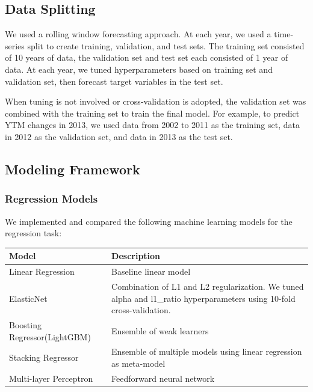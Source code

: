 \documentclass[12pt]{article}
\begin{document}
\subsection{Data Splitting}

We used a rolling window forecasting approach. At each year, we used a time-series split to create training, validation, and test sets. The training set consisted of 10 years of data, the validation set and test set each consisted of 1 year of data. At each year, we tuned hyperparameters based on training set and validation set, then forecast target variables in the test set.

When tuning is not involved or cross-validation is adopted, the validation set was combined with the training set to train the final model. For example, to predict YTM changes in 2013, we used data from 2002 to 2011 as the training set, data in 2012 as the validation set, and data in 2013 as the test set. 

\subsection{Modeling Framework}

\subsubsection{Regression Models}

We implemented and compared the following machine learning models for the regression task:

\begin{singlespace}
\begin{table}[H]
\centering
\begin{tabular}{ll}
\toprule
\textbf{Model} & \textbf{Description} \\
\midrule
Linear Regression & Baseline linear model \\
ElasticNet & Combination of L1 and L2 regularization. We tuned alpha and l1\_ratio hyperparameters using 10-fold cross-validation. \\
Boosting Regressor(LightGBM) & Ensemble of weak learners \\
Stacking Regressor & Ensemble of multiple models using linear regression as meta-model \\
Multi-layer Perceptron & Feedforward neural network \\
\bottomrule
\end{tabular}
\end{table}
\end{singlespace}
\end{document}
